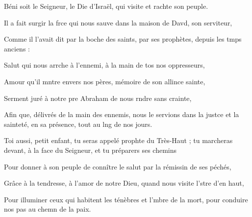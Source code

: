 \item Béni soit le Seigneur, le Die d’Israël,\psstar{} qui visite et rachte son peuple.
\item Il a fait surgir la frce qui nous sauve\psstar{} dans la maison de Davd, son serviteur,
\item Comme il l’avait dit par la boche des saints,\psstar{} par ses prophètes, depuis les tmps anciens :
\item Salut qui nous arrche à l’ennemi,\psstar{} à la main de tos nos oppresseurs,
\item Amour qu’il mntre envers nos pères,\psstar{} mémoire de son allince sainte,
\item Serment juré à notre pre Abraham\psstar{} de nous rndre sans crainte,
\item Afin que, délivrés de la main des ennemis,\pscross{} nous le servions dans la justce et la sainteté,\psstar{} en sa présence, tout au lng de nos jours.
\item Toi aussi, petit enfant, tu seras appelé prophte du Très-Haut ;\psstar{} tu marcheras devant, à la face du Seigneur, et tu préparers ses chemins
\item Pour donner à son peuple de connître le salut\psstar{} par la rémissin de ses péchés,
\item Grâce à la tendresse, à l’amor de notre Dieu,\psstar{} quand nous visite l’stre d’en haut,
\item Pour illuminer ceux qui habitent les ténèbres et l’mbre de la mort,\psstar{} pour conduire nos pas au chemn de la paix.
